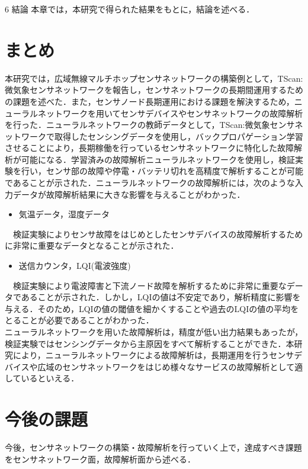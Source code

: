 \chapterhead
{6}
{結論}
{本章では，本研究で得られた結果をもとに，結論を述べる．}

\section{まとめ}
本研究では，広域無線マルチホップセンサネットワークの構築例として，TScan:微気象センサネットワークを報告し，センサネットワークの長期間運用するための課題を述べた．また，センサノード長期運用における課題を解決するため，ニューラルネットワークを用いてセンサデバイスやセンサネットワークの故障解析を行った．ニューラルネットワークの教師データとして，TScan:微気象センサネットワークで取得したセンシングデータを使用し，バックプロパゲーション学習させることにより，長期稼働を行っているセンサネットワークに特化した故障解析が可能になる．学習済みの故障解析ニューラルネットワークを使用し，検証実験を行い，センサ部の故障や停電・バッテリ切れを高精度で解析することが可能であることが示された．ニューラルネットワークの故障解析には，次のような入力データが故障解析結果に大きな影響を与えることがわかった．
\begin{itemize}
\item 気温データ，湿度データ
\end{itemize}
　検証実験によりセンサ故障をはじめとしたセンサデバイスの故障解析するために非常に重要なデータとなることが示された．
\begin{itemize}
\item 送信カウンタ，LQI(電波強度)
\end{itemize}
　検証実験により電波障害と下流ノード故障を解析するために非常に重要なデータであることが示された．しかし，LQIの値は不安定であり，解析精度に影響を与える．そのため，LQIの値の閾値を細かくすることや過去のLQIの値の平均をとることが必要であることがわかった．\\

ニューラルネットワークを用いた故障解析は，精度が低い出力結果もあったが，検証実験ではセンシングデータから主原因をすべて解析することができた．本研究により，ニューラルネットワークによる故障解析は，長期運用を行うセンサデバイスや広域のセンサネットワークをはじめ様々なサービスの故障解析として適しているといえる．

\newpage

\section{今後の課題}
今後，センサネットワークの構築・故障解析を行っていく上で，達成すべき課題をセンサネットワーク面，故障解析面から述べる．
